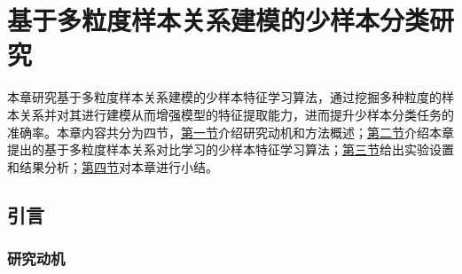 \chapter[\hspace{0pt}基于多粒度样本关系建模的少样本分类研究]{{\heiti{}\hspace{0pt}基于多粒度样本关系建模的少样本分类研究}}\label{chapter3: 基于多粒度样本关系建模的少样本分类研究}
\removelofgap
\removelotgap
本章研究基于多粒度样本关系建模的少样本特征学习算法，通过挖掘多种粒度的样本关系并对其进行建模从而增强模型的特征提取能力，进而提升少样本分类任务的准确率。本章内容共分为四节，\hyperref[section3: 引言]{第一节}介绍研究动机和方法概述；\hyperref[section3: 基于多粒度样本关系对比学习的少样本特征学习算法]{第二节}介绍本章提出的基于多粒度样本关系对比学习的少样本特征学习算法；\hyperref[section3: 实验设置及结果分析]{第三节}给出实验设置和结果分析；\hyperref[section3: 本章小结]{第四节}对本章进行小结。

\section[\hspace{-2pt}引言]{{\heiti{} \hspace{-8pt}引言}}\label{section3: 引言}

\subsection[\hspace{-2pt}研究动机]{{\heiti{} \hspace{-8pt}研究动机}}\label{section3: 研究动机}

